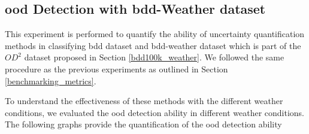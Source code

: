     	
    \newpage
    \subsection{\acrlong{ood} Detection with \acrshort{bdd}-Weather dataset}
    \label{Exp:5}
    This experiment is performed to quantify the ability of uncertainty quantification methods in classifying \acrshort{bdd} dataset and \acrshort{bdd}-weather dataset which is part of the $OD^2$ dataset proposed in Section \ref{bdd100k_weather}. We followed the same procedure as the previous experiments as outlined in Section \ref{benchmarking_metrics}. 

    To understand the effectiveness of these methods with the different weather conditions, we evaluated the \acrshort{ood} detection ability in different weather conditions. The following graphs provide the quantification of the \acrshort{ood} detection ability
    
